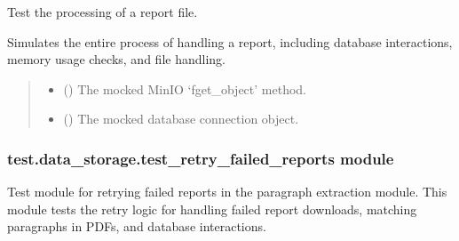 \documentclass[letterpaper,10pt,english]{sphinxmanual}
\begin{document}
\begin{fulllineitems}
\label{\detokenize{test.data_storage:test.data_storage.test_paragraph_extraction.test_process_report}}
\pysigstartsignatures
\pysiglinewithargsret
{}
{\sphinxparamcomma {}}
{}
\pysigstopsignatures
\sphinxAtStartPar
Test the processing of a report file.

\sphinxAtStartPar
Simulates the entire process of handling a report, including database interactions,
memory usage checks, and file handling.
\begin{quote}\begin{description}
\begin{itemize}
\item {} 
\sphinxAtStartPar
{} () \textendash{} The mocked MinIO ‘fget\_object’ method.

\item {} 
\sphinxAtStartPar
{} () \textendash{} The mocked database connection object.

\end{itemize}

\end{description}\end{quote}

\end{fulllineitems}



\subsubsection{test.data\_storage.test\_retry\_failed\_reports module}
\label{\detokenize{test.data_storage:module-test.data_storage.test_retry_failed_reports}}\label{\detokenize{test.data_storage:test-data-storage-test-retry-failed-reports-module}}
\sphinxAtStartPar
Test module for retrying failed reports in the paragraph extraction module.
This module tests the retry logic for handling failed report downloads,
matching paragraphs in PDFs, and database interactions.
\end{document}
